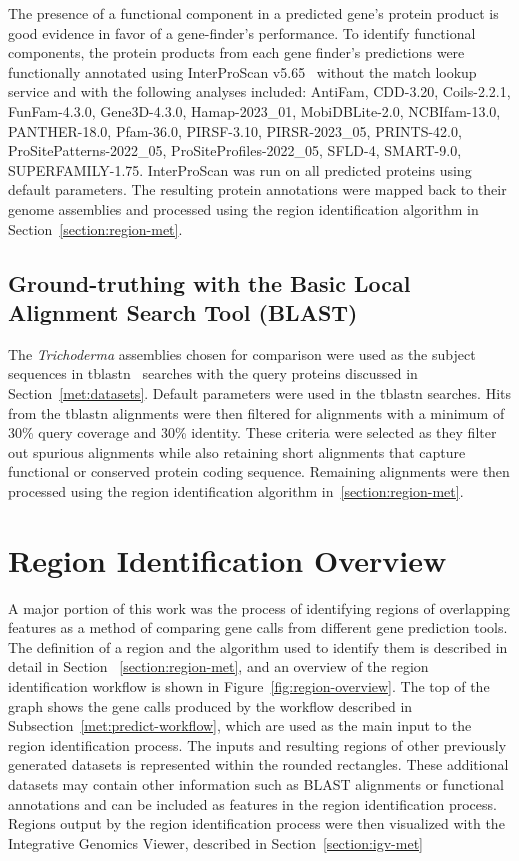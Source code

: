 The presence of a functional component in a predicted gene's protein
product is good evidence in favor of a gene-finder's performance. To
identify functional components, the protein products from each gene
finder's predictions were functionally annotated using InterProScan
v5.65~\cite{jones2014} without the match
lookup service and with the following analyses included: AntiFam,
CDD-3.20, Coils-2.2.1, FunFam-4.3.0, Gene3D-4.3.0, Hamap-2023\_01,
MobiDBLite-2.0, NCBIfam-13.0, PANTHER-18.0, Pfam-36.0, PIRSF-3.10,
PIRSR-2023\_05, PRINTS-42.0, ProSitePatterns-2022\_05,
ProSiteProfiles-2022\_05, SFLD-4, SMART-9.0,
SUPERFAMILY-1.75. InterProScan was run on all predicted proteins using
default parameters. The resulting protein annotations were mapped back
to their genome assemblies and processed using the region
identification algorithm in Section~\ref{section:region-met}.

\subsection{Ground-truthing with the Basic Local Alignment Search Tool (BLAST)}\label{met:blast}

The \textit{Trichoderma} assemblies chosen for comparison were used as
the subject sequences in tblastn~\cite{gertz2006} searches with the query proteins discussed in Section~\ref{met:datasets}. Default parameters were used in the tblastn searches. Hits from the tblastn alignments were then filtered for alignments with a minimum of 30\% query coverage and 30\% identity. These criteria were selected as they filter out spurious alignments while also retaining short alignments that capture functional or conserved protein coding sequence. Remaining alignments were then processed using the region identification algorithm in~\ref{section:region-met}. 

\section{Region Identification Overview}\label{section:region-overview}

A major portion of this work was the process of identifying regions of
overlapping features as a method of comparing gene calls from
different gene prediction tools. The definition of a region and the algorithm
used to identify them is described in detail in Section
~\ref{section:region-met}, and an overview of the region identification
workflow is shown in Figure~\ref{fig:region-overview}. The top of the
graph shows the gene calls produced by the workflow described in
Subsection~\ref{met:predict-workflow}, which are used as the main input
to the region identification process. The inputs and resulting regions of other previously
generated datasets is represented within the rounded rectangles. These additional datasets may contain other
information such as BLAST alignments or functional annotations and can
be included as features in the region identification process. Regions output by the region identification process
were then visualized with the Integrative Genomics Viewer, described
in Section~\ref{section:igv-met}

